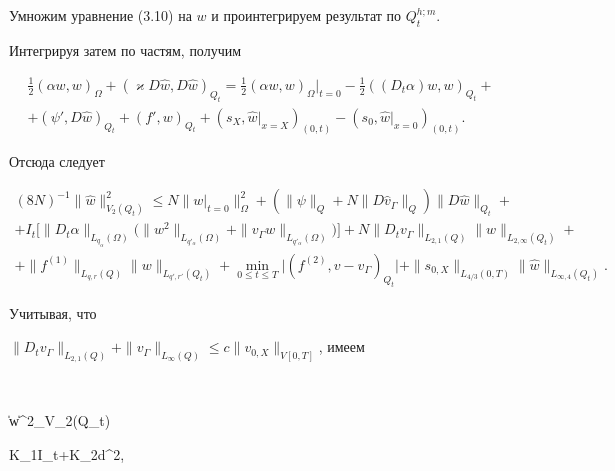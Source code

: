 Умножим уравнение (3.10) на $w$ и проинтегрируем результат по $Q_t^{h;m}$.


Интегрируя затем по частям, получим


\begin{multline*}


\frac{1}{2}(\alpha w,w)_\Omega+(\varkappa D\widehat w, D\widehat w)_{Q_t}=


\frac{1}{2}(\alpha w,w)_\Omega|_{t=0}


-\frac{1}{2}((D_t\alpha) w,w)_{Q_t} +\\


+(\psi',D\widehat w)_{Q_t}+(f',w)_{Q_t}


+(s_X,\widehat w|_{x=X})_{(0,t)} - (s_0,\widehat w|_{x=0})_{(0,t)}.


\end{multline*}


Отсюда следует


\begin{multline*}


(8N)^{-1}\|\widehat w\|_{V_2(Q_t)}^2\le


N\|w|_{t=0}\|^2_\Omega +(\|\psi\|_Q+N\|D\widehat v_\Gamma\|_Q)


\|D\widehat w\|_{Q_t}+\\


+I_t\big[\|D_t\alpha\|_{L_{q_\alpha}(\Omega)}


\big(\|w^2\|_{L_{q'_\alpha}(\Omega)}+


\|v_{\Gamma}w\|_{L_{q'_\alpha}(\Omega)}\big)


\big]+N\|D_tv_{\Gamma}\|_{L_{2,1}(Q)}\|w\|_{L_{2,\infty}(Q_t)}+\\


+\|f^{(1)}\|_{L_{q,r}(Q)}\|w\|_{L_{q',r'}(Q_t)}


+\min_{0\le t\le T}\big|(f^{(2)},v-v_{\Gamma})_{Q_t}\big|


+\|s_{0,X}\|_{L_{4/3}(0,T)}\|\widehat w\|_{L_{\infty,4}(Q_t)}.


\end{multline*}


Учитывая, что


$\|D_tv_{\Gamma}\|_{L_{2,1}(Q)}+


\|v_{\Gamma}\|_{L_\infty(Q)}\le c\|v_{0,X}\|_{V[0,T]}$, имеем


$$


\|\widehat w\|^2_{V_2(Q_t)}\le


K_1I_t+K_2d^2,


